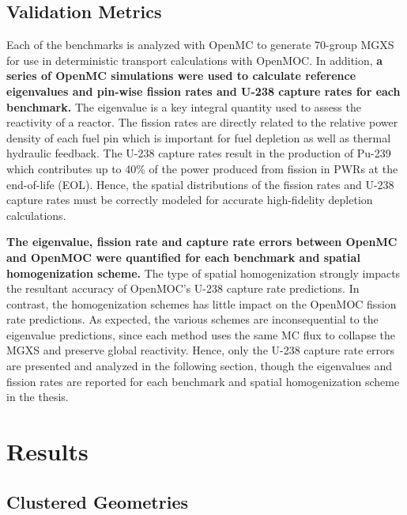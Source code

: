 \documentclass[12pt,twoside]{mitthesis-exec}
\begin{document}
\subsection*{Validation Metrics}

Each of the benchmarks is analyzed with OpenMC to generate 70-group MGXS for use in deterministic transport calculations with OpenMOC. In addition, \textbf{a series of OpenMC simulations were used to calculate reference eigenvalues and pin-wise fission rates and U-238 capture rates for each benchmark.} The eigenvalue is a key integral quantity used to assess the reactivity of a reactor. The fission rates are directly related to the relative power density of each fuel pin which is important for fuel depletion as well as thermal hydraulic feedback. The U-238 capture rates result in the production of Pu-239 which contributes up to 40\% of the power produced from fission in PWRs at the end-of-life (EOL). Hence, the spatial distributions of the fission rates and U-238 capture rates must be correctly modeled for accurate high-fidelity depletion calculations. 

\textbf{The eigenvalue, fission rate and capture rate errors between OpenMC and OpenMOC were quantified for each benchmark and spatial homogenization scheme.} The type of spatial homogenization strongly impacts the resultant accuracy of OpenMOC's U-238 capture rate predictions. In contrast, the homogenization schemes has little impact on the OpenMOC fission rate predictions. As expected, the various schemes are inconsequential to the eigenvalue predictions, since each method uses the same MC flux to collapse the MGXS and preserve global reactivity. Hence, only the U-238 capture rate errors are presented and analyzed in the following section, though the eigenvalues and fission rates are reported for each benchmark and spatial homogenization scheme in the thesis.


\section*{Results}

\subsection*{Clustered Geometries}
\end{document}
